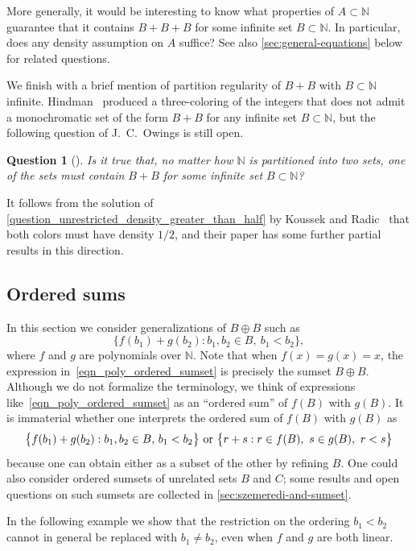 \documentclass[10pt,dvipsnames]{article}
\newtheorem{question}[theorem]{Question}
\theoremstyle{definition}
\theoremstyle{plain}
\newcommand{\N}{\mathbb{N}}
\begin{document}
More generally, it would be interesting to know what properties of $A \subset \N$ guarantee that it contains $B+B+B$ for some infinite set $B \subset \N$. In particular, does any density assumption on $A$ suffice?
See also \cref{sec:general-equations} below for related questions.

We finish with a brief mention of partition regularity of $B+B$ with $B \subset \N$ infinite.
Hindman~\cite[Section 2]{Hindman1979-another} produced a three-coloring of the integers that does not admit a monochromatic set of the form $B+B$ for any infinite set $B\subset\N$, but the following question of J.\ C.\ Owings is still open.

\begin{question}[{\cite[Problem~E2494]{AmerMathMon1974Oct}}]
Is it true that, no matter how $\N$ is partitioned into two sets, one of the sets must contain $B+B$ for some infinite set $B \subset \N$?
\end{question}
It follows from the solution of 
\cref{question_unrestricted_density_greater_than_half}  by Koussek and Radic~\cite{KR} that both colors must have density $1/2$, and their paper has some further partial results in this direction.

\subsection{Ordered sums}
\label{sec:ordered}


In this section we consider generalizations of $B \oplus B$ such as
\begin{equation}
\label{eqn_poly_ordered_sumset}
\big\{f(b_1)+g(b_2): b_1,b_2\in B,~b_1<b_2\big\},
\end{equation}
where $f$ and $g$ are polynomials over $\N$.
Note that when $f(x)=g(x)=x$, the expression in~\eqref{eqn_poly_ordered_sumset} is precisely the sumset $B\oplus B$.
Although we do not formalize the terminology, we think of expressions like~\eqref{eqn_poly_ordered_sumset} as an ``ordered sum'' of $f(B)$ with $g(B)$.
It is immaterial whether one interprets the ordered sum of $f(B)$ with $g(B)$ as
\[
\big\{ f(b_1) + g(b_2) :b_1,b_2\in B,\, b_1 < b_2 \big\} \textup{ or }
\big\{ r + s : r\in f(B),~s\in g(B),~ r < s \big\}
\]
because one can obtain either as a subset of the other by refining $B$.
One could also consider ordered sumsets of unrelated sets $B$ and $C$; some results and open questions on such sumsets are collected in \cref{sec:szemeredi-and-sumset}.

In the following example we show that the restriction on the ordering $b_1< b_2$ cannot in general be replaced with $b_1\neq b_2$, even when $f$ and $g$ are both linear.
\end{document}
